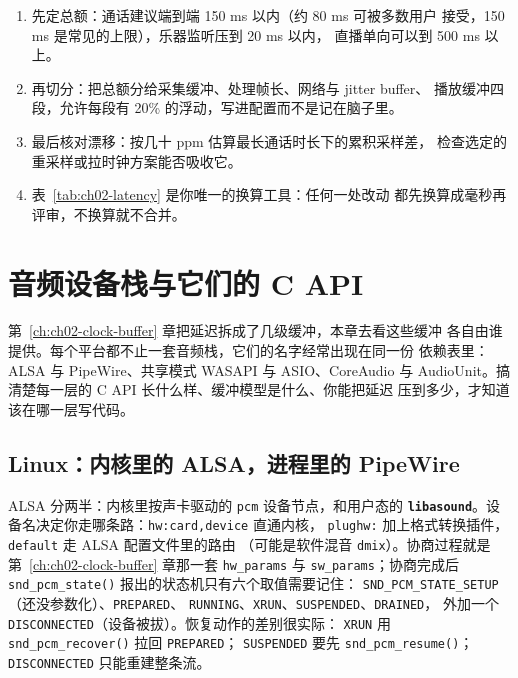 \documentclass[12pt,a4paper,fontset=fandol]{ctexbook}
\newcommand{\Fn}[1]{\texttt{#1()}}
\newcommand{\Tp}[1]{\texttt{#1}}
\newcommand{\Lib}[1]{\textbf{\texttt{#1}}}
\begin{document}
\begin{bestpractice}[title={把延迟预算写成一张表再动手}]
\begin{enumerate}
  \item 先定总额：通话建议端到端 150 ms 以内（约 80 ms 可被多数用户
        接受，150 ms 是常见的上限），乐器监听压到 20 ms 以内，
        直播单向可以到 500 ms 以上。
  \item 再切分：把总额分给采集缓冲、处理帧长、网络与 jitter buffer、
        播放缓冲四段，允许每段有 20\% 的浮动，写进配置而不是记在脑子里。
  \item 最后核对漂移：按几十 ppm 估算最长通话时长下的累积采样差，
        检查选定的重采样或拉时钟方案能否吸收它。
  \item 表~\ref{tab:ch02-latency} 是你唯一的换算工具：任何一处改动
        都先换算成毫秒再评审，不换算就不合并。
\end{enumerate}
\end{bestpractice}

\chapter{音频设备栈与它们的 C API}
\label{ch:ch03-audio-device}

第~\ref{ch:ch02-clock-buffer} 章把延迟拆成了几级缓冲，本章去看这些缓冲
各自由谁提供。每个平台都不止一套音频栈，它们的名字经常出现在同一份
依赖表里：ALSA 与 PipeWire、共享模式 WASAPI 与 ASIO、CoreAudio 与
AudioUnit。搞清楚每一层的 C API 长什么样、缓冲模型是什么、你能把延迟
压到多少，才知道该在哪一层写代码。

\section{Linux：内核里的 ALSA，进程里的 PipeWire}
\label{sec:ch03-alsa-pipewire}

ALSA 分两半：内核里按声卡驱动的 \Tp{pcm} 设备节点，和用户态的
\Lib{libasound}{}。设备名决定你走哪条路：\Tp{hw:card,device} 直通内核，
\Tp{plughw:} 加上格式转换插件，\Tp{default} 走 ALSA 配置文件里的路由
（可能是软件混音 \Tp{dmix}）。协商过程就是第~\ref{ch:ch02-clock-buffer}
章那一套 \Tp{hw\_params} 与 \Tp{sw\_params}；协商完成后
\Fn{snd\_pcm\_state} 报出的状态机只有六个取值需要记住：
\Tp{SND\_PCM\_STATE\_SETUP}（还没参数化）、\Tp{PREPARED}、
\Tp{RUNNING}、\Tp{XRUN}、\Tp{SUSPENDED}、\Tp{DRAINED}，
外加一个 \Tp{DISCONNECTED}（设备被拔）。恢复动作的差别很实际：
\Tp{XRUN} 用 \Fn{snd\_pcm\_recover} 拉回 \Tp{PREPARED}；
\Tp{SUSPENDED} 要先 \Fn{snd\_pcm\_resume}；\Tp{DISCONNECTED}
只能重建整条流。
\end{document}
